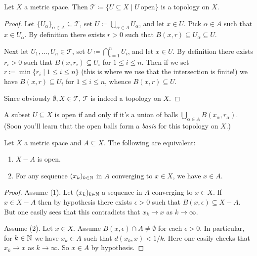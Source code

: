 \begin{proposition}
  Let $X$ a metric space. Then $\mathcal{T} \coloneqq \{U \subseteq X
  \mid U\ \text{open}\}$ is a topology on $X$.
\end{proposition}

\begin{proof}
  Let $\{U_\alpha\}_{\alpha \in A} \subseteq \mathcal{T}$, set $U
  \coloneqq \bigcup_{\alpha \in A} U_\alpha$, and let $x \in U$. Pick
  $\alpha \in A$ such that $x \in U_\alpha$. By definition there
  exists $r > 0$ such that $B(x,r) \subseteq U_\alpha \subseteq U$.

  Next let $U_1,\ldots,U_n \in \mathcal{T}$, set $U \coloneqq
  \bigcap_{i=1}^n U_i$, and let $x \in U$. By definition there exists
  $r_i > 0$ such that $B(x,r_i) \subseteq U_i$ for $1 \le i \le
  n$. Then if we set $r \coloneqq \min \{r_i \mid 1 \le i \le n\}$
  (this is where we use that the intersection is finite!) we have
  $B(x,r) \subseteq U_i$ for $1 \le i \le n$, whence $B(x,r) \subseteq
  U$.

  Since obviously $\emptyset, X \in \mathcal{T}$, $\mathcal{T}$ is
  indeed a topology on $X$.
\end{proof}

\begin{exercise}
  \label{unionofballs}
  A subset $U \subseteq X$ is open if and only if it's a union of
  balls $\bigcup_{\alpha \in A} B(x_\alpha, r_\alpha)$. (Soon you'll
  learn that the open balls form a \textit{basis} for this topology on
  $X$.)
\end{exercise}

\begin{proposition}
  Let $X$ a metric space and $A \subseteq X$. The following are
  equivalent:
  \begin{enumerate}
  \item $X - A$ is open.
  \item For any sequence $(x_k)_{k \in \mathbb{N}}$ in $A$ converging to $x
    \in X$, we have $x \in A$.
  \end{enumerate}
\end{proposition}

\begin{proof}
  Assume (1). Let $(x_k)_{k \in \mathbb{N}}$ a sequence in $A$ converging to
  $x \in X$. If $x \in X - A$ then by hypothesis there exists
  $\epsilon > 0$ such that $B(x, \epsilon) \subseteq X - A$. But one
  easily sees that this contradicts that $x_k \to x$ as $k \to
  \infty$.

  Assume (2). Let $x \in X$. Assume $B(x,\epsilon) \cap A \ne
  \emptyset$ for each $\epsilon > 0$. In particular, for $k \in \mathbb{N}$ we
  have $x_k \in A$ such that $d(x_k,x) < 1/k$. Here one easily checks
  that $x_k \to x$ as $k \to \infty$. So $x \in A$ by hypothesis.
\end{proof}

